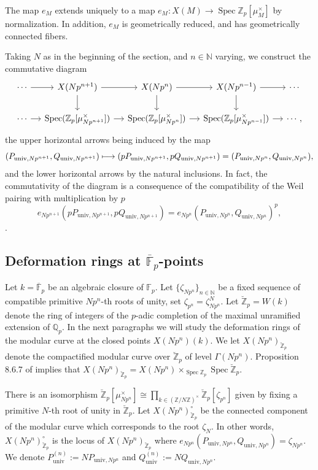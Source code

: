 \documentclass[JEP,XML,SOM,Unicode,published]{cedram}
\newcommand\mto{\mathchoice{\longmapsto}{\mapsto}{\mapsto}{\mapsto}}
\newcommand{\univ}{\mathrm{univ}}
\numberwithin{equation}{section}
\theoremstyle{definition}
\newcommand{\bb}[1]{\mathbb{#1}}
\DeclareMathOperator{\Spec}{Spec}
\newcommand{\mc}[1]{X(Np^{#1})}
\begin{document}
The map $e_M$ extends uniquely to a map $e_M: X(M)\to \Spec \bb{Z}_p[\mu_{M}^\times]$ by normalization. In addition, $e_M$ is geometrically reduced, and has geometrically connected fibers.

Taking $N$ as in the beginning of the section, and $n\in \bb{N}$ varying, we construct the commutative diagram\vspace*{-3pt}
\[
\begin{tikzcd}[column sep = small]
\cdots \ar[r] & \mc{n+1}\ar[d] \ar[r] & \mc{n} \ar[d]\ar[r] & \mc{n-1} \ar[r]\ar[d]& \cdots \\
\cdots \ar[r] & \Spec(\bb{Z}_p[\mu^\times_{Np^{n+1}}]) \ar[r]& \Spec(\bb{Z}_p[\mu^\times_{Np^{n}}]) \ar[r]& \Spec(\bb{Z}_p[\mu^\times_{Np^{n-1}}]) \ar[r] & \cdots,
\end{tikzcd}
\]
the upper horizontal arrows being induced by the map\vspace*{-3pt}
\[
(P_{\univ,Np^{n+1}}, Q_{\univ,Np^{n+1}})\mto (pP_{\univ,Np^{n+1}}, pQ_{\univ,Np^{n+1}})=(P_{\univ,Np^{n}}, Q_{\univ,Np^{n}}),
\]
and the lower horizontal arrows by the natural inclusions. In fact, the commutativity of the diagram is a consequence of the compatibility of the Weil pairing with multiplication by $p$\vspace*{-3pt}
\[
e_{Np^{n+1}}(pP_{\univ,Np^{n+1}}, pQ_{\univ,Np^{n+1}})= e_{Np^{n}}(P_{\univ,Np^{n}}, Q_{\univ,Np^{n}})^p,
\]
\cf \cite[Th.\,5.5.7 \& 5.6.3]{katz1985arithmetic}.

\subsection*{Deformation rings at $\overline{\bb{F}}_p$-points}

Let $k=\overline{\bb{F}}_p$ be an algebraic closure of $\bb{F}_p$. Let $\{\zeta_{Np^n}\}_{n\in \bb{N}}$ be a fixed sequence of compatible primitive $Np^n$-th roots of unity, set $\zeta_{p^n}=\zeta_{Np^n}^{N}$. Let $\breve{\bb{Z}}_{p}=W(k)$ denote the ring of integers of the $p$-adic completion of the maximal unramified extension of $\bb{Q}_p$. In the next paragraphs we will study the deformation rings of the modular curve at the closed points $X(Np^n)(k)$. We let $X(Np^n)_{\breve{\bb{Z}}_p}$ denote the compactified modular curve over $\breve{\bb{Z}}_p$ of level $\Gamma(Np^n)$. Proposition 8.6.7 of \cite{katz1985arithmetic} implies that $\mc{n}_{\breve{\bb{Z}}_p}= \mc{n}\times_{\Spec \bb{Z}_p} \Spec \breve{\bb{Z}}_p$.

There is an isomorphism $\breve{\bb{Z}}_p [\mu_{Np^n}^{\times}]\cong \prod_{k\in (\bb{Z}/N\bb{Z})^{\times}} \breve{\bb{Z}}_p[\zeta_{p^n}]$ given by fixing a primitive $N$-th root of unity in $\breve{\bb{Z}}_p$. Let $\mc{n}_{\breve{\bb{Z}}_p}^{\circ}$ be the connected component of the modular curve which corresponds to the root $\zeta_N$. In other words, $\mc{n}_{\breve{\bb{Z}}_p}^\circ$ is the locus of $\mc{n}_{\breve{\bb{Z}}_p}$ where $e_{Np^n}(P_{\univ,Np^n}, Q_{\univ,Np^n})= \zeta_{Np^n}$. We denote $P_{\univ}^{(n)}:=N P_{\univ,Np^{n}}$ and $Q_{\univ}^{(n)}:=NQ_{\univ,Np^n}$.
\end{document}
